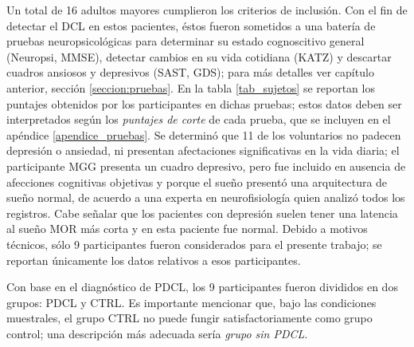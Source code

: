 \documentclass[12pt,letterpaper]{book}
\begin{document}
Un total de 16 adultos mayores cumplieron los criterios de inclusión. 
%
Con el fin de detectar el DCL en estos pacientes, éstos fueron sometidos a una batería de pruebas neuropsicológicas para determinar su estado cognoscitivo general (Neuropsi, MMSE), detectar cambios en su vida cotidiana (KATZ) y descartar cuadros ansiosos y depresivos (SAST, GDS); para más detalles ver capítulo anterior, sección \ref{seccion:pruebas}.
%
En la tabla \ref{tab_sujetos} se reportan los puntajes obtenidos por los participantes en dichas pruebas; estos datos deben ser interpretados según los \textit{puntajes de corte} de cada prueba, que se incluyen en el apéndice \ref{apendice_pruebas}.
%
Se determinó que 11 de los voluntarios no padecen depresión o ansiedad, ni presentan afectaciones significativas en la vida diaria; el participante MGG presenta un cuadro depresivo, pero fue incluido en ausencia de afecciones cognitivas objetivas y porque el sueño presentó una arquitectura de sueño normal, de acuerdo a una experta en neurofisiología quien analizó todos los registros. Cabe señalar que los pacientes con depresión suelen tener una latencia al sueño MOR más corta y en esta paciente fue normal.
%
Debido a motivos técnicos, sólo 9 participantes fueron considerados para el presente trabajo; se reportan únicamente los datos relativos a esos participantes.

Con base en el diagnóstico de PDCL, los 9 participantes fueron divididos en dos grupos: PDCL y CTRL. 
%
Es importante mencionar que, bajo las condiciones muestrales, el grupo CTRL no puede fungir satisfactoriamente como grupo control; una descripción más adecuada sería \textit{grupo sin PDCL}.
\end{document}

